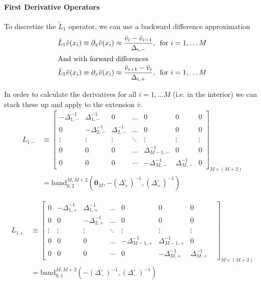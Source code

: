 \documentclass[11pt]{article}
\newcommand{\band}{\ensuremath{\mathrm{band}}}
\newcommand{\D}[1][]{\ensuremath{\partial_{#1}}}
\theoremstyle{definition}
\begin{document}
\paragraph{First Derivative Operators}
To discretize the $\tilde{L}_1$ operator, we can use a backward difference approximation
\begin{align}
\tilde{L}_1 \tilde{v}(x_i) &\equiv \D[x] \tilde{v}(x_i) \approx \frac{\bar{v}_i - \bar{v}_{i-1}}{\Delta_{i,-}},\, \text{ for } i = 1,\ldots M\label{eq:first-order-bd-irregular}\\
\intertext{And with forward differences}
\tilde{L}_1 \tilde{v}(x_i) &\equiv \D[x] \tilde{v}(x_i) \approx \frac{\bar{v}_{i+1} - \bar{v}_i}{\Delta_{i,+}},\, \text{ for } i = 1,\ldots M\label{eq:first-order-fd-irregular}
\end{align}

In order to calculate the derivatives for all $i = 1, \ldots M$ (i.e. in the interior) we can stack these up and apply to the extension $\bar{v}$.
\begin{align}\label{eq:L-1-minus-extended}
{L}_{1-} &\equiv\begin{bmatrix}
-\Delta_{1,-}^{-1}&\Delta_{1,-}^{-1}&0&\dots&0&0&0\\
0&-\Delta_{2,-}^{-1}&\Delta_{2,-}^{-1}&\dots&0&0&0\\
\vdots&\vdots&\vdots&\ddots&\vdots&\vdots&\vdots\\
0&0&0&\dots&\Delta_{M-1,-}^{-1}&0&0\\
0&0&0&\cdots&-\Delta_{M,-}^{-1}&\Delta_{M,-}^{-1}&0
\end{bmatrix}_{M\times (M+2)} \\
&= 
\band^{M,M+2}_{0,2}(\mathbf{0}_M, -(\Delta_+^\circ)^{-1}, (\Delta_+^\circ)^{-1})
\end{align}

\begin{align}\label{eq:L-1-plus-extended}
{L}_{1+} &\equiv \begin{bmatrix}
0&-\Delta_{1,+}^{-1}&\Delta_{1,+}^{-1}&\dots&0&0&0\\
0&0&-\Delta_{2,+}^{-1}&\dots&0&0&0\\
\vdots&\vdots&\vdots&\ddots&\vdots&\vdots&\vdots\\
0&0&0&\dots&-\Delta_{M-1,+}^{-1}&\Delta_{M-1,+}^{-1}&0\\
0&0&0&\cdots&0&-\Delta_{M,+}^{-1}&\Delta_{M,+}^{-1}&
\end{bmatrix}_{M\times (M+2)} \\
&= 
\band^{M,M+2}_{0,1}(-(\Delta_-^\circ)^{-1}, (\Delta_-^\circ)^{-1})
\end{align}
\end{document}
